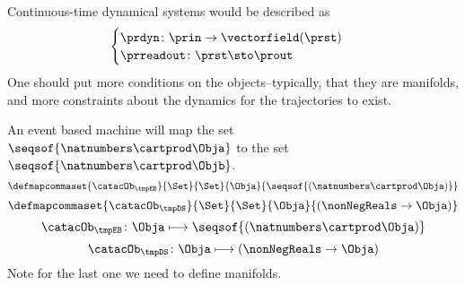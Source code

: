Continuous-time dynamical systems would be described as
%
\begin{equation}
	\label{eq:continuous}
	\begin{cases}
		\prdyn\colon \prin \to \vectorfield(\prst) \\
		\prreadout\colon \prst \sto   \prout
	\end{cases}
\end{equation}
%
One should put more conditions on the objects--typically, that they are manifolds, and more constraints about the dynamics for the trajectories to exist.

An event based machine will map the set~$\seqsof{\natnumbers \cartprod \Obja}$ to the set~$\seqsof{\natnumbers \cartprod \Objb}$.
%
\begin{equation}
	\defmapcommaset{
		\catacOb_{\tmpEB}
	}{
		\Set
	}{
		\Set
	}{
		\Obja
	}{
		\seqsof{(\natnumbers \cartprod \Obja)}
	}
\end{equation}
%
\begin{equation}
	\defmapcommaset{
		\catacOb_{\tmpDS}
	}{
		\Set
	}{
		\Set
	}{
		\Obja
	}{
		(\nonNegReals \to \Obja)
	}
\end{equation}
%
\begin{equation}
	\label{eq:phi-EB}
	{\catacOb_{\tmpEB}}\colon{\Obja}\longmapsto{\seqsof{(\natnumbers \cartprod \Obja)}}
\end{equation}
%
\begin{equation}
	\label{eq:phi-DS}
	{\catacOb_{\tmpDS}}\colon{\Obja}\longmapsto{(\nonNegReals \to \Obja)}
\end{equation}
%
Note for the last one we need to define manifolds.
